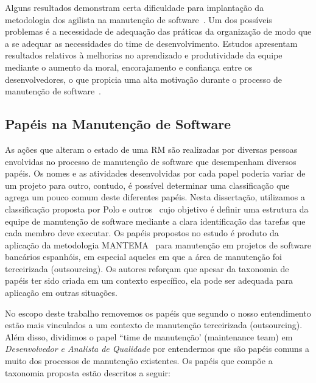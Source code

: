 Alguns resultados demonstram certa dificuldade para implantação da metodologia
dos agilista na manutenção de software~\cite{1402140}. Um dos possíveis
problemas é a necessidade de adequação das práticas da organização de modo que a
se adequar as necessidades do time de desenvolvimento.  Estudos apresentam
resultados relativos à melhorias no aprendizado e produtividade da equipe
mediante o aumento da moral, encorajamento e confiança entre os desenvolvedores,
o que propicia uma alta motivação durante o processo de manutenção de
software~\cite{Choudhari:2014:EIM:2557833.2557845}.


\subsection{Papéis na Manutenção de Software}
\label{subsec:man_visao_geral_papeis_na_manutencao_de_software}

As ações que alteram o estado de uma RM são realizadas por diversas pessoas
envolvidas no processo de manutenção de software que desempenham diversos
papéis. Os nomes e as atividades desenvolvidas por cada papel poderia variar de
um projeto para outro, contudo, é possível determinar uma classificação que
agrega um pouco comum deste diferentes papéis. Nesta dissertação, utilizamos a
classificação proposta por Polo e outros~\cite{Polo1999} cujo objetivo é definir
uma estrutura da equipe de manutenção de software mediante a clara identificação
das tarefas que cada membro deve executar. Os papéis propostos no estudo é
produto da aplicação da metodologia MANTEMA~\cite{756695} para manutenção em
projetos de software bancários espanhóis, em especial aqueles em que a área de
manutenção foi terceirizada (outsourcing). Os autores reforçam que apesar da
taxonomia de papéis ter sido criada em um contexto específico, ela pode ser
adequada para aplicação em outras situações.

No escopo deste trabalho removemos os papéis que segundo o nosso entendimento
estão mais vinculados a um contexto de manutenção terceirizada (outsourcing).
Além disso, dividimos o papel ``time de manutenção' (maintenance team) em
\textit{Desenvolvedor e Analista de Qualidade} por entendermos que são papéis
comuns a muito dos processos de manutenção existentes. Os papéis que compõe a
taxonomia proposta estão descritos a seguir:

